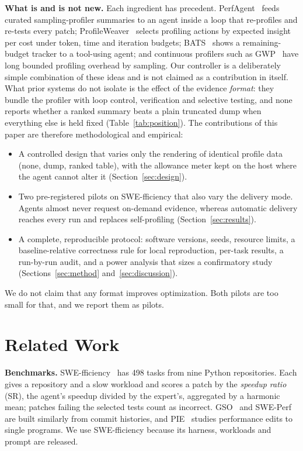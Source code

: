 \documentclass[conference]{IEEEtran}
\begin{document}
\textbf{What is and is not new.} Each ingredient has precedent.
PerfAgent~\cite{deng2026perfagent} feeds curated sampling-profiler summaries to
an agent inside a loop that re-profiles and re-tests every patch;
ProfileWeaver~\cite{ding2026profileweaver} selects profiling actions by
expected insight per cost under token, time and iteration budgets;
BATS~\cite{liu2025bats} shows a remaining-budget tracker to a tool-using
agent; and continuous profilers such as GWP~\cite{ren2010gwp} have long bounded
profiling overhead by sampling. Our controller is a deliberately simple
combination of these ideas and is not claimed as a contribution in itself.
What prior systems do not isolate is the effect of the evidence
\emph{format}: they bundle the profiler with loop control, verification and
selective testing, and none reports whether a ranked summary beats a plain
truncated dump when everything else is held fixed (Table~\ref{tab:position}).
The contributions of this paper are therefore methodological and empirical:
\begin{itemize}
\item A controlled design that varies only the rendering of identical profile
  data (none, dump, ranked table), with the allowance meter kept on the host
  where the agent cannot alter it (Section~\ref{sec:design}).
\item Two pre-registered pilots on SWE-fficiency that also vary the delivery
  mode. Agents almost never request on-demand evidence, whereas automatic
  delivery reaches every run and replaces self-profiling
  (Section~\ref{sec:results}).
\item A complete, reproducible protocol: software versions, seeds, resource
  limits, a baseline-relative correctness rule for local reproduction,
  per-task results, a run-by-run audit, and a power analysis that sizes a
  confirmatory study (Sections~\ref{sec:method} and~\ref{sec:discussion}).
\end{itemize}
We do not claim that any format improves optimization. Both pilots are too
small for that, and we report them as pilots.

\section{Related Work}

\textbf{Benchmarks.} SWE-fficiency~\cite{ma2025swefficiency} has 498 tasks
from nine Python repositories. Each gives a repository and a slow workload and
scores a patch by the \emph{speedup ratio} (SR), the agent's speedup divided by
the expert's, aggregated by a harmonic mean; patches failing the selected
tests count as incorrect. GSO~\cite{shetty2025gso} and
SWE-Perf~\cite{he2025sweperf} are built similarly from commit histories, and
PIE~\cite{shypula2023pie} studies performance edits to single programs. We use
SWE-fficiency because its harness, workloads and prompt are released.
\end{document}
